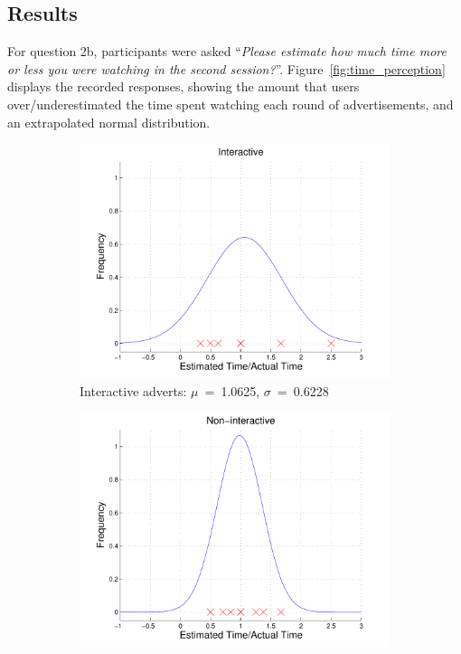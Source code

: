 	\subsection{Results}


	For question 2b, participants were asked ``\textit{Please estimate how much time more or less you were watching in the second session?}''. Figure~\ref{fig:time_perception} displays the recorded responses, showing the amount that users over/underestimated the time spent watching each round of advertisements, and an extrapolated normal distribution.

	\begin{figure}[!ht]
		\centering
		\begin{subfigure}[h]{0.49\textwidth}
			\centering
			\includegraphics[width=\textwidth]{images/interactive_bell.pdf}
			\caption{Interactive adverts: $\mu$~=~1.0625, $\sigma$~=~0.6228}
		\end{subfigure}
		\begin{subfigure}[h]{0.49\textwidth}
			\centering
			\includegraphics[width=\textwidth]{images/noninteractive_bell.pdf}

\end{subfigure}
\end{figure}
